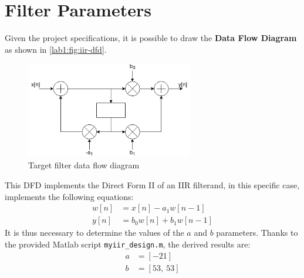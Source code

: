 \section{Filter Parameters}
Given the project specifications, it is possible to draw the \textbf{Data Flow Diagram} as shown in \autoref{lab1:fig:iir-dfd}.
\begin{figure}[htbp]
	\center
	\includegraphics[width=0.65\textwidth]{chapter1/images/iir-dfd.png}
	\caption{Target filter data flow diagram}
	\label{lab1:fig:iir-dfd}
\end{figure}

This DFD implements the Direct Form II of an IIR filterand, in this specific case, implements the following equations:
\begin{align}\label{eqn:iir2}
	w[n] &= x[n] - a_1 w[n-1] \\
	y[n] &= b_0 w[n] + b_1 w[n-1]
\end{align}
It is thus necessary to determine the values of the $a$ and $b$ parameters. Thanks to the provided Matlab script \texttt{myiir\_design.m}, the derived results are:
\begin{align}
    a &= [-21] \\
    b &= [53,\ 53]
\end{align}
